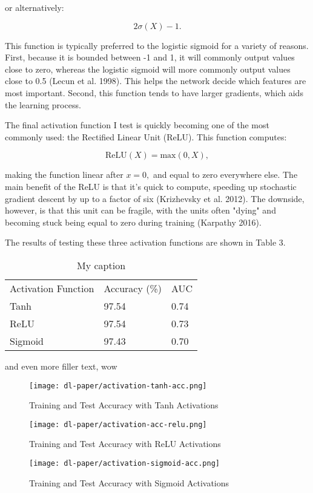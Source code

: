 \documentclass[12pt]{article}  %
\theoremstyle{definition}
\theoremstyle{remark}
\begin{document}
or alternatively:

$$ 2\sigma{(X)} - 1. $$

\par This function is typically preferred to the  logistic sigmoid for a variety of reasons. First, because it is bounded between -1 and 1,  it will commonly output values close to zero, whereas the logistic sigmoid will more commonly output values close to 0.5 (Lecun et al. 1998). This helps the network decide which features are most important. Second,  this function tends to have larger gradients, which aids the learning process. 
\par The final activation function I test is quickly becoming one of the most commonly used: the Rectified Linear Unit (ReLU). This function computes:

$$ \text{ReLU}(X) = \text{max}(0,X), $$

making the function linear after $x=0,$ and equal to zero everywhere else. The main benefit of the ReLU is that it's quick to compute, speeding up stochastic gradient descent by up to a factor of six (Krizhevsky et al. 2012). The downside, however, is that this unit can be fragile, with the units often "dying" and becoming stuck being equal to zero during training (Karpathy 2016).

\par The results of testing these three activation functions are shown in Table 3. 

\begin{table}[]
\centering
\caption{My caption}
\label{my-label}
\begin{tabular}{lll}
Activation Function & Accuracy (\%) & AUC  \\
Tanh                & 97.54         & 0.74 \\
ReLU                & 97.54         & 0.73 \\
Sigmoid             & 97.43         & 0.70
\end{tabular}
\end{table}

\par and even more filler text, wow 

\begin{figure}[!htb]
  \texttt{[image: dl-paper/activation-tanh-acc.png]}
  \caption{Training and Test Accuracy with Tanh Activations}\label{tanh-acc}
\endminipage\hfill
{}
  \texttt{[image: dl-paper/activation-acc-relu.png]}
  \caption{Training and Test Accuracy with ReLU Activations}\label{relu-acc}
\endminipage\hfill
{}%
  \texttt{[image: dl-paper/activation-sigmoid-acc.png]}
  \caption{Training and Test Accuracy with Sigmoid Activations}\label{sigmoid-acc}
\endminipage
\end{figure}
\end{document}
